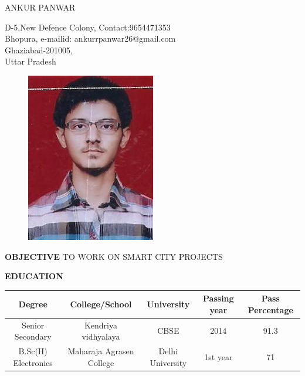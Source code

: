 \documentclass{article}
\begin{document}
\begin{center}
	{
		\large{ANKUR PANWAR}
	}
\end{center}
\begin{flushleft}
D-5,New Defence Colony, \hspace{2.8in} Contact:9654471353\\
Bhopura, \hspace{2.8in} e-mailid: ankurrpanwar26@gmail.com\\
Ghaziabad-201005,\\
Uttar Pradesh\\
\end{flushleft}
\vspace{-0.3in}
\begin{figure}[h]
\hspace{4.4in}
	\includegraphics{img.jpg}
\end{figure}

\begin{flushleft}
	\textbf{OBJECTIVE}
	\vspace{-0.20in}
	\hspace{.5in}
	TO WORK ON SMART CITY PROJECTS
\end{flushleft}

\begin{flushleft}
	\vspace{0.30in}
	\textbf{EDUCATION}
	\hspace{0.45in}
	\begin{tabular}{|c|c|c|c|c|}
	\hline
	
	Degree&College/School&University&Passing year&Pass Percentage\\
	\hline
	Senior Secondary&Kendriya vidhyalaya&CBSE&2014&91.3\\
	\hline
	B.Sc(H) Electronics&Maharaja Agrasen College&Delhi University&1st year&71%
	
	\end{tabular}
\end{flushleft}
\end{document}
